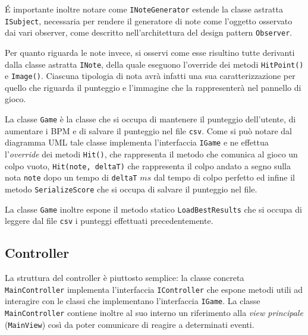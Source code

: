 É importante inoltre notare come \texttt{INoteGenerator} estende la classe astratta \texttt{ISubject}, necessaria per rendere il generatore di note come l'oggetto osservato dai vari observer, come descritto nell'architettura del design pattern \texttt{Observer}.

Per quanto riguarda le note invece, si osservi come esse risultino tutte derivanti dalla classe astratta \texttt{INote}, della quale eseguono l'override dei metodi \texttt{HitPoint()} e \texttt{Image()}. Ciascuna tipologia di nota avrà infatti una sua caratterizzazione per quello che riguarda il punteggio e l'immagine che la rappresenterà nel pannello di gioco.

\vspace{1cm}
\begin{figure}[h]
\end{figure}
La classe \texttt{Game} è la classe che si occupa di mantenere il punteggio dell'utente, di aumentare i BPM e di salvare il punteggio nel file \texttt{csv}.
Come si può notare dal diagramma UML tale classe implementa l'interfaccia \texttt{IGame} e ne effettua l'\emph{override} dei metodi \texttt{Hit()}, che rappresenta il metodo che comunica al gioco un colpo vuoto, \texttt{Hit(note, deltaT)} che rappresenta il colpo andato a segno sulla nota \texttt{note} dopo un tempo di \texttt{deltaT} $ms$ dal tempo di colpo perfetto ed infine il metodo \texttt{SerializeScore} che si occupa di salvare il punteggio nel file.

La classe \texttt{Game} inoltre espone il metodo statico \texttt{LoadBestResults} che si occupa di leggere dal file \texttt{csv} i punteggi effettuati precedentemente.

\newpage
\subsection{Controller}
\begin{figure}[h]
\end{figure}
La struttura del controller è piuttosto semplice: la classe concreta \texttt{MainController} implementa l'interfaccia \texttt{IController} che espone metodi utili ad interagire con le classi che implementano l'interfaccia \texttt{IGame}.
La classe \texttt{MainController} contiene inoltre al suo interno un riferimento alla \emph{view principale} (\texttt{MainView}) così da poter comunicare di reagire a determinati eventi.

